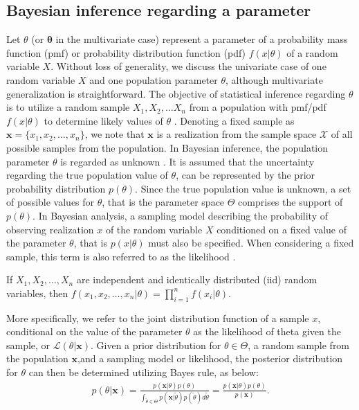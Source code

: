 \begin{DoubleSpace*}
\section{Bayesian inference regarding a parameter}
Let $\theta$ (or $\boldsymbol{\theta}$ in the multivariate case) represent a parameter of a probability mass function (pmf) or probability distribution function (pdf)  $f(x|\theta)$ of a random variable $X$. Without loss of generality, we discuss the univariate case of one random variable $X$ and one population parameter $\theta$, although multivariate generalization is straightforward. The objective of statistical inference regarding $\theta$ is to utilize a random sample $X_1, X_2, \hdots X_n$ from a population with pmf/pdf $f(x|\theta)$ to determine likely values of $\theta$ \cite{casella2002}. Denoting a fixed sample as $\textbf{x}=\{x_1, x_2,\hdots, x_n \}$, we note that $\textbf{x}$ is a realization from the sample space $\mathcal{X}$ of all possible samples from the population. In Bayesian inference, the population parameter $\theta$ is regarded as unknown \cite{hoff2009}. It is assumed that the uncertainty regarding the true population value of $\theta$, can be represented by the prior probability distribution $p(\theta)$. Since the true population value is unknown, a set of possible values for $\theta$, that is the parameter space $\Theta$ comprises the support of $p(\theta)$. In Bayesian analysis, a sampling model describing the probability of observing realization $x$ of the random variable $X$ conditioned on a fixed value of the parameter $\theta$, that is $p(x|\theta)$ must also be specified. When considering a fixed sample, this term is also referred to as the  likelihood \cite{casella2002}. 
\begin{theorem}
	 If $X_1, X_2, \hdots, X_n$ are independent and identically distributed (iid) random variables, then $f(x_1,x_2,\hdots, x_n|\theta)=\prod_{i=1}^n f(x_i|\theta)$.
\end{theorem}
More specifically, we refer to the joint distribution function of a sample $x$, conditional on the value of the parameter $\theta$ as the likelihood of theta given the sample, or $\mathcal{L}(\theta|\textbf{x})$. Given a prior distribution for $\theta\in \Theta$, a random sample from the population $\textbf{x}$,and a sampling model or likelihood, the posterior distribution for $\theta$ can then be determined utilizing Bayes rule, as below\cite{hoff2009}:
\begin{gather}
	p(\theta|\textbf{x})=\frac{p(\textbf{x}|\theta)p(\theta)}{\int_{\tilde{\theta} \in \Theta} p(\textbf{x}|\tilde{\theta})p(\tilde{\theta})d\tilde{\theta}}=\frac{p(\textbf{x}|\theta)p(\theta)}{p(\textbf{x})}.

\end{gather}
\end{DoubleSpace*}
